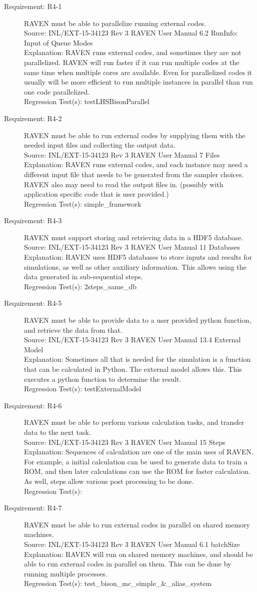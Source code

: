 \documentclass{article}
\newcommand{\requirement}[5]{\item[Requirement: #1] #2 \\Source: #3\\Explanation: #4\\Regression Test(s): #5}
\begin{document}
\begin{description}
\requirement{R4-1}{RAVEN must be able to parallelize running external codes.}
{INL/EXT-15-34123 Rev 3 RAVEN User Manual 6.2 RunInfo: Input of Queue Modes}
{RAVEN runs external codes, and sometimes they are not parallelized.  RAVEN will run faster if it can run multiple codes at the same time when multiple cores are available.  Even for parallelized codes it usually will be more efficient to run multiple instances in parallel than run one code parallelized.}
{testLHSBisonParallel}

\requirement{R4-2}{RAVEN must be able to run external codes by supplying them with the needed input files and collecting the output data.}
{INL/EXT-15-34123 Rev 3 RAVEN User Manual 7 Files}
{RAVEN runs external codes, and each instance may need a different input file that needs to be generated from the sampler choices.  RAVEN also may need to read the output files in. (possibly with application specific code that is user provided.)}
{simple\_framework}

\requirement{R4-3}{RAVEN must support storing and retrieving data in a HDF5 database.}
{INL/EXT-15-34123 Rev 3 RAVEN User Manual 11 Databases}
{RAVEN uses HDF5 databases to store inputs and results for simulations, as well as other auxiliary information.  This allows using the data generated in sub-sequential steps.}
{2steps\_same\_db}

\requirement{R4-5}{RAVEN must be able to provide data to a user provided python function, and retrieve the data from that.}
{INL/EXT-15-34123 Rev 3 RAVEN User Manual 13.4 External Model}
{Sometimes all that is needed for the simulation is a function that can be calculated in Python.  The external model allows this.  This executes a python function to determine the result.}
{testExternalModel}

\requirement{R4-6}{RAVEN must be able to perform various calculation tasks, and transfer data to the next task.}
{INL/EXT-15-34123 Rev 3 RAVEN User Manual 15 Steps}
{Sequences of calculation are one of the main uses of RAVEN.  For example, a initial calculation can be used to generate data to train a ROM, and then later calculations can use the ROM for faster calculation.  As well, steps allow various post processing to be done.}
{} %

\requirement{R4-7}{RAVEN must be able to run external codes in parallel on shared memory machines.}
{INL/EXT-15-34123 Rev 3 RAVEN User Manual 6.1 batchSize}
{RAVEN will run on shared memory machines, and should be able to run external codes in parallel on them.  This can be done by running multiple processes.}
{test\_bison\_mc\_simple\_\&\_alias\_system}


\end{description}
\end{document}
